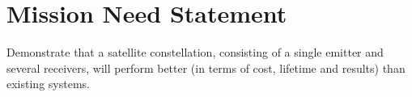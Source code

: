 \section{Mission Need Statement}
\label{dsePPMNS}
Demonstrate that a satellite constellation, consisting of a single emitter and several receivers, will perform better (in terms of cost, lifetime and results) than existing systems.